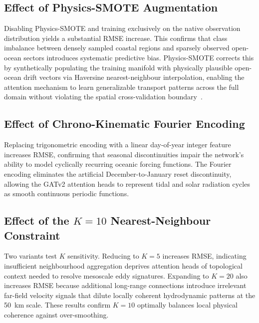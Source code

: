 \documentclass[conference]{IEEEtran}
\begin{document}
\subsection{Effect of Physics-SMOTE Augmentation}

Disabling Physics-SMOTE and training exclusively on the native observation distribution yields a substantial RMSE increase. This confirms that class imbalance between densely sampled coastal regions and sparsely observed open-ocean sectors introduces systematic predictive bias. Physics-SMOTE corrects this by synthetically populating the training manifold with physically plausible open-ocean drift vectors via Haversine nearest-neighbour interpolation, enabling the attention mechanism to learn generalizable transport patterns across the full domain without violating the spatial cross-validation boundary~\cite{ref28}.

\subsection{Effect of Chrono-Kinematic Fourier Encoding}

Replacing trigonometric encoding with a linear day-of-year integer feature increases RMSE, confirming that seasonal discontinuities impair the network's ability to model cyclically recurring oceanic forcing functions. The Fourier encoding eliminates the artificial December-to-January reset discontinuity, allowing the GATv2 attention heads to represent tidal and solar radiation cycles as smooth continuous periodic functions.

\subsection{Effect of the $K=10$ Nearest-Neighbour Constraint}

Two variants test $K$ sensitivity. Reducing to $K=5$ increases RMSE, indicating insufficient neighbourhood aggregation deprives attention heads of topological context needed to resolve mesoscale eddy signatures. Expanding to $K=20$ also increases RMSE because additional long-range connections introduce irrelevant far-field velocity signals that dilute locally coherent hydrodynamic patterns at the 50~km scale. These results confirm $K=10$ optimally balances local physical coherence against over-smoothing.
\end{document}
